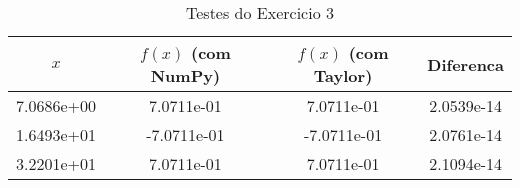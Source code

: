 
    \begin{table}[h!]
    \centering
    \caption{Testes do Exercicio 3}
    \label{tab:testes_exercicio_3}
    \begin{tabular}{|c|c|c|c|}
    \toprule
    \textbf{$x$} & \textbf{$f(x)$ (com NumPy)} & \textbf{$f(x)$ (com Taylor)} & \textbf{Diferenca} \\
    \midrule   
    7.0686e+00 & 7.0711e-01 & 7.0711e-01 & 2.0539e-14 \\
                            1.6493e+01 & -7.0711e-01 & -7.0711e-01 & 2.0761e-14 \\
                            3.2201e+01 & 7.0711e-01 & 7.0711e-01 & 2.1094e-14 \\
                            
    \bottomrule
    \end{tabular}
    \end{table}    
    